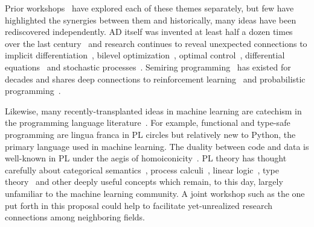 \documentclass{article}
\begin{document}
    Prior workshops~\cite{lafi2019, ptml2019, cap2020} have explored each of these themes separately, but few have highlighted the synergies between them and historically, many ideas have been rediscovered independently. AD itself was invented at least half a dozen times over the last century~\cite{baydin2018automatic} and research continues to reveal unexpected connections to implicit differentiation~\cite{christianson1998reverse}, bilevel optimization~\cite{stadie2020learning}, optimal control~\cite{nikishin2021control}, differential equations~\cite{chen2018neural} and stochastic processes~\cite{li2020scalable}.  Semiring programming~\cite{gondran2008graphs} has existed for decades and shares deep connections to reinforcement learning~\cite{baras2010path} and probabilistic programming~\cite{belle2020semiring}.

    Likewise, many recently-transplanted ideas in machine learning are catechism in the programming language literature~\citep{church1941calculi}.  For example, functional and type-safe programming are lingua franca in PL circles but relatively new to Python, the primary language used in machine learning.  The duality between code and data is well-known in PL under the aegis of homoiconicity~\cite{abelson1996structure}. PL theory has thought carefully about categorical semantics~\cite{barr1990category}, process calculi~\cite{blute1997bisimulation}, linear logic~\cite{girard1987linear}, type theory~\citep{martin1984intuitionistic} and other deeply useful concepts which remain, to this day, largely unfamiliar to the machine learning community. A joint workshop such as the one put forth in this proposal could help to facilitate yet-unrealized research connections among neighboring fields.

    \pagebreak
\end{document}
